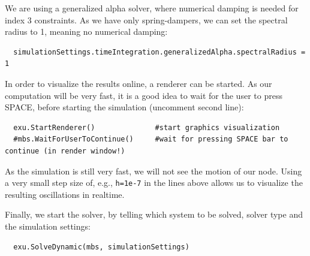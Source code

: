 %
We are using a generalized alpha solver, where numerical damping is needed for index 3 constraints. As we have only spring-dampers, we can set the spectral radius to 1, meaning no numerical damping:
\pythonstyle\begin{lstlisting}
  simulationSettings.timeIntegration.generalizedAlpha.spectralRadius = 1
\end{lstlisting}
%
In order to visualize the results online, a renderer can be started. As our computation will be very fast, it is a good idea to wait for the user to press SPACE, before starting the simulation (uncomment second line):
\pythonstyle\begin{lstlisting}
  exu.StartRenderer()              #start graphics visualization
  #mbs.WaitForUserToContinue()     #wait for pressing SPACE bar to continue (in render window!)
\end{lstlisting}
As the simulation is still very fast, we will not see the motion of our node. Using a very small step size of, e.g., \texttt{h=1e-7} in the lines above allows us to visualize the resulting oscillations in realtime.

%
Finally, we start the solver, by telling which system to be solved, solver type and the simulation settings:
\pythonstyle\begin{lstlisting}
  exu.SolveDynamic(mbs, simulationSettings)
\end{lstlisting}
%

